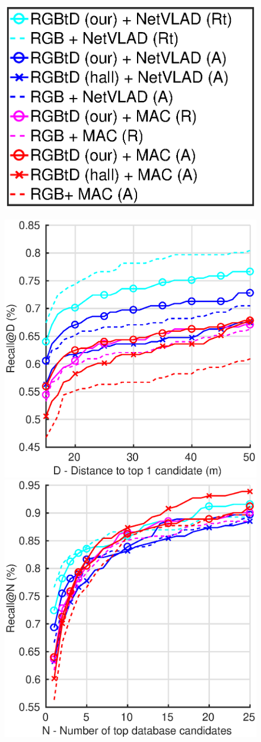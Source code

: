 \begin{figure}
	\center
	\begin{minipage}{0.14\linewidth}
		\includegraphics[trim={90 140 95 100},clip,width=\linewidth]{plot/fig/legend}	
	\end{minipage}
	\begin{minipage}{0.85\linewidth}
	
	\begin{minipage}{0.49\linewidth}		
		\center
		\includegraphics[width=0.49\linewidth]{plot/fig/sun_distance}	
		\includegraphics[width=0.49\linewidth]{plot/fig/sun_recall}
		

\end{minipage}
\end{minipage}
\end{figure}
